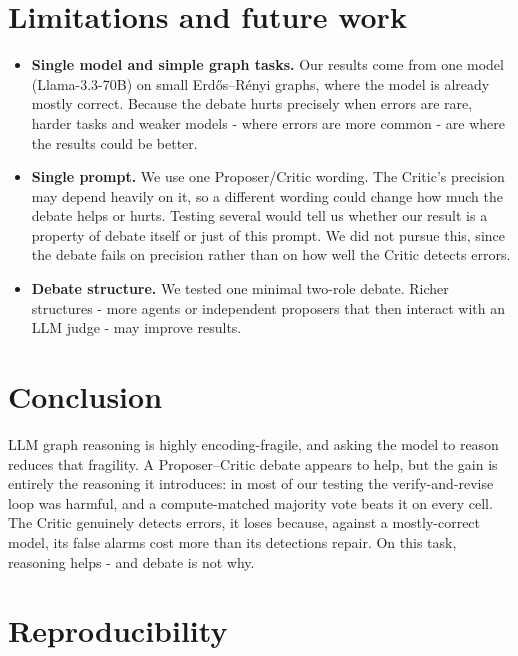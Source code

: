 \documentclass[11pt]{article}
\begin{document}
\section{Limitations and future work}
\label{sec:future}
\begin{itemize}[nosep,leftmargin=*]
  \item \textbf{Single model and simple graph tasks.} Our results come from one model
    (Llama-3.3-70B) on small Erd\H{o}s--R\'enyi graphs, where the model is already
    mostly correct. Because the debate hurts precisely when errors are rare, harder
    tasks and weaker models - where errors are more common - are where the results could
    be better.
  \item \textbf{Single prompt.} We use one Proposer/Critic wording. The Critic's
    precision may depend heavily on it, so a different wording could change how much
    the debate helps or hurts. Testing several would tell us whether our result is a
    property of debate itself or just of this prompt. We did not pursue this, since
    the debate fails on precision rather than on how well the Critic detects errors.
  \item \textbf{Debate structure.} We tested one minimal two-role debate. Richer
    structures - more agents or independent proposers that then interact with an LLM judge - may improve results.
\end{itemize}

\section{Conclusion}
\label{sec:conclusion}
LLM graph reasoning is highly encoding-fragile, and asking the model to reason
reduces that fragility. A Proposer--Critic debate appears to help, but the gain is
entirely the reasoning it introduces: in most of our testing the verify-and-revise loop was harmful,
and a compute-matched majority vote beats it on every cell. The Critic genuinely
detects errors, it loses because, against a mostly-correct model, its false alarms
cost more than its detections repair. On this task, reasoning helps - and debate is
not why.



\clearpage
\appendix

\renewcommand{\thesection}{Appendix~\Alph{section}}

\section{Reproducibility}
\label{sec:repro}
\end{document}

